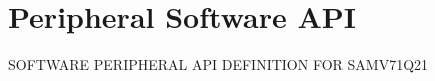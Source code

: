 \hypertarget{group__SAMV71Q21__api}{}\section{Peripheral Software A\+PI}
\label{group__SAMV71Q21__api}
S\+O\+F\+T\+W\+A\+RE P\+E\+R\+I\+P\+H\+E\+R\+AL A\+PI D\+E\+F\+I\+N\+I\+T\+I\+ON F\+OR S\+A\+M\+V71\+Q21 